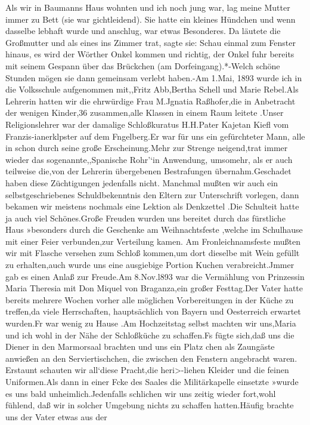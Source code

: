 \documentclass[a4paper,11pt]{article}
\begin{document}
Als wir in Baumanns Haus wohnten und ich noch jung war, lag meine Mutter immer zu Bett (sie war gichtleidend). Sie hatte ein kleines Hündchen und wenn dasselbe lebhaft wurde und anschlug, war etwas Besonderes. Da läutete die Großmutter und als eines ins Zimmer trat, sagte sie: Schau einmal zum Fenster hinaus, es wird der Wörther Onkel kommen und richtig, der Onkel fuhr bereits mit seinem Gespann über das Brückchen (am Dorfeingang).*-Welch schöne Stunden mögen sie dann gemeinsam verlebt haben.-Am 1.Mai, 1893 wurde ich in die Volksschule aufgenommen mit,,Fritz Abb,Bertha Schell und Marie Rebel.Als Lehrerin hatten wir die ehrwürdige Frau M.Jgnatia Raßhofer,die in Anbetracht der wenigen Kinder,36 zusammen,alle Klassen in einem Raum leitete .Unser Religionslehrer war der damalige Schloßkuratus H.H.Pater Kajetan Kiefl vom Franzis-ianerklpster auf dem Fngelberg.Er war für uns ein gefürchteter Mann, alle in schon durch seine große Erscheinung.Mehr zur Strenge neigend,trat immer wieder das sogenannte,,Spanische Rohr'‘in Anwendung, umsomehr, als er auch teilweise die,von der Lehrerin übergebenen Bestrafungen übernahm.Geschadet haben diese Züchtigungen jedenfalls nicht. Manchmal mußten wir auch ein selbstgeschriebenes Schuldbekenntnis den Eltern zur Unterschrift vorlegen, dann bekamen wir meistens nochmals eine Lektion als Denkzettel .Die Schulteit hatte ja auch viel Schönes.Große Freuden wurden uns bereitet durch das fürstliche Haus »besonders durch die Geschenke am Weihnachtsfeste ,welche im Schulhause mit einer Feier verbunden,zur Verteilung kamen. Am Fronleichnamsfeste mußten wir mit Flasche versehen zum Schloß kommen,um dort dieselbe mit Wein gefüllt zu erhalten,auch wurde uns eine ausgiebige Portion Kuchen verabreicht.Jmmer gab es einen Anlaß zur Freude.Am 8.Nov.l893 war die Vermählung von Prinzessin Maria Theresia mit Don Miquel von Braganza,ein großer Festtag.Der Vater hatte bereits mehrere Wochen vorher alle möglichen Vorbereitungen in der Küche zu treffen,da viele Herrschaften, hauptsächlich von Bayern und Oesterreich erwartet wurden.Fr war wenig zu Hause .Am Hochzeitstag selbst machten wir uns,Maria und ich wohl in der Nähe der Schloßküche zu schaffen.Fs fügte sich,daß uns die Diener in den Marmorsaal brachten und uns ein Platz chen als Zaungäste anwießen an den Serviertischchen, die zwischen den Fenstern angebracht waren. Erstaunt schauten wir all‘diese Pracht,die heri>-liehen Kleider und die feinen Uniformen.Als dann in einer Fcke des Saales die Militärkapelle einsetzte »wurde es uns bald unheimlich.Jedenfalls schlichen wir uns zeitig wieder fort,wohl fühlend, daß wir in solcher Umgebung nichts zu schaffen hatten.Häufig brachte uns der Vater etwas aus der
\end{document}
